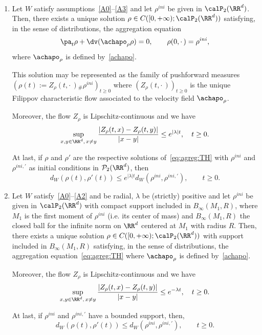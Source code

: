 \begin{theo}\label{Exist}\ 
\begin{enumerate}\romanenumi
\item \label{2.1.1} Let $W$ satisfy assumptions~\eqref{A0}--\eqref{A3} and let $\rho^{ini}$ be given in $\calP_2(\RR^d)$. Then, there exists a unique solution $\rho \in C([0,+\infty);\calP_2(\RR^d))$ satisfying, in the sense of distributions, the aggregation equation
\begin{equation}\label{eq:agreg:TH}
\pa_t \rho + \dv(\achapo_{\rho} \rho ) = 0, \qquad \rho(0,{\cdot\,})=\rho^{ini},
\end{equation}
where $\achapo_{\rho}$ is defined by~\eqref{achapo}.

This solution may be represented as the family of pushforward measures $(\rho(t):=Z_{\rho}(t,{\cdot\,}){}_\# \rho^{ini})_{t \geq 0}$ where $(Z_{\rho}(t,{\cdot\,}))_{t \geq 0}$ is the unique Filippov characteristic flow associated to the velocity field $\achapo_{\rho}$.

Moreover, the flow $Z_{\rho}$ is Lipschitz-continuous and we have
\[
\sup_{x,y\in \RR^d, \, x \not = y}
\frac{\vert Z_{\rho}(t,x) - Z_{\rho}(t,y) \vert}{\vert x- y \vert}
\leq e^{{\vert \lambda \vert}t}, \quad t \geq 0.
\]

At last, if $\rho$ and $\rho'$ are the respective solutions of~\eqref{eq:agreg:TH} with $\rho^{ini}$ and $\rho^{ini,\prime}$ as initial conditions in ${\mathcal P}_{2}(\RR^d)$, then
\[
d_{W}(\rho(t),\rho'(t)) \leq e^{\vert \lambda \vert t} d_{W}(\rho^{ini},\rho^{ini,\prime}), \qquad t \geq 0.
\]

\item \label{2.1.2} Let $W$ satisfy~\eqref{A0}--\eqref{A2} and be radial, $\lambda$ be (strictly) positive and let $\rho^{ini}$ be given in $\calP_2(\RR^d)$ with compact support included in $B_\infty(M_1,R)$, where $M_1$ is the first moment of $\rho^{ini}$ (i.e. its center of mass) and $B_\infty(M_1,R)$ the closed ball for the infinite norm on $\RR^d$ centered at $M_1$ with radius $R$. Then, there exists a unique solution $\rho \in C([0,+\infty);\calP_2(\RR^d))$ with support included in $B_\infty(M_1,R)$ satisfying, in the sense of distributions, the aggregation equation~\eqref{eq:agreg:TH} where $\achapo_{\rho}$ is defined by~\eqref{achapo}.

Moreover, the flow $Z_{\rho}$ is Lipschitz-continuous and we have
\begin{equation}\label{bound1Xbis}
\sup_{x,y\in \RR^d, \, x \not = y}
\frac{\vert Z_{\rho}(t,x) - Z_{\rho}(t,y) \vert}{\vert x- y \vert}
\leq e^{-\lambda t}, \quad t \geq 0.
\end{equation}

At last, if $\rho^{ini}$ and $\rho^{ini,\prime}$ have a bounded support, then,
\[
d_{W}(\rho(t),\rho'(t)) \leq d_{W}(\rho^{ini},\rho^{ini,\prime}), \qquad t \geq 0.
\]
\end{enumerate}
\end{theo}

